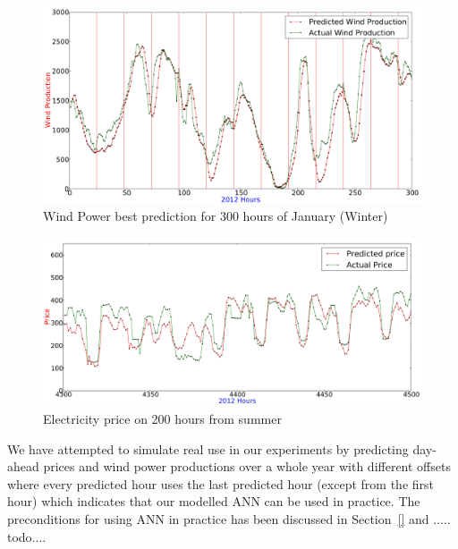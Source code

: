 \begin{figure}[H]
\centering
\includegraphics[width=0.99\linewidth]{billeder/bestPossiblePredictionWindProduction0-300.png}
\caption{Wind Power best prediction for 300 hours of January (Winter)}
\label{fig:abilityToPredictWindPower}
\end{figure}

\begin{figure}[H]
\centering
\includegraphics[width=\linewidth]{billeder/PriceExperimentalAnalysis/summer.jpg}
\caption{Electricity price on 200 hours from summer}
\label{fig:abilityToPredictElectricityPrice}
\end{figure}

We have attempted to simulate real use in our experiments by predicting day-ahead prices and wind power productions over a whole year with different offsets where every predicted hour uses the last predicted hour (except from the first hour) which indicates that our modelled ANN can be used in practice. The preconditions for using ANN in practice has been discussed in Section~\ref{} and ..... todo{....}
 
